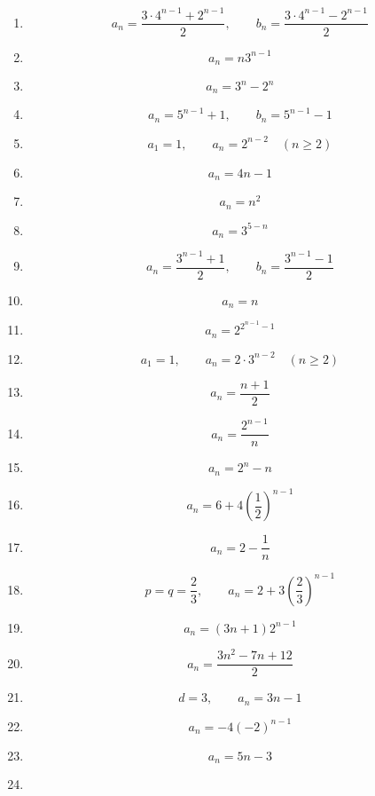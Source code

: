 \begin{enumerate}[label=\textbf{問\arabic*.},leftmargin=3.8em,format=\bookitemlink{practice-basic}{answer}{problem}]
        \item \[
            a_n=
            \frac{3\cdot4^{n-1}+2^{n-1}}2,
            \qquad
            b_n=
            \frac{3\cdot4^{n-1}-2^{n-1}}2
          \]
        \item \[
            a_n=n3^{n-1}
          \]
        \item \[
            a_n=3^n-2^n
          \]
        \item \[
            a_n=5^{n-1}+1,
            \qquad
            b_n=5^{n-1}-1
          \]
        \item \[
            a_1=1,\qquad
            a_n=2^{n-2}\quad(n\ge2)
          \]
        \item \[
            a_n=4n-1
          \]
        \item \[
            a_n=n^2
          \]
        \item \[
            a_n=3^{5-n}
          \]
        \item \[
            a_n=\frac{3^{n-1}+1}{2},
            \qquad
            b_n=\frac{3^{n-1}-1}{2}
          \]
        \item \[
            a_n=n
          \]
        \item \[
            a_n=2^{2^{n-1}-1}
          \]
        \item \[
            a_1=1,\qquad
            a_n=2\cdot3^{n-2}\quad(n\ge2)
          \]
        \item \[
            a_n=\frac{n+1}{2}
          \]
        \item \[
            a_n=\frac{2^{n-1}}{n}
          \]
        \item \[
            a_n=2^n-n
          \]
        \item \[
            a_n=6+4\left(\frac12\right)^{n-1}
          \]
        \item \[
            a_n=2-\frac1n
          \]
        \item \[
            p=q=\frac23,
            \qquad
            a_n=2+3\left(\frac23\right)^{n-1}
          \]
        \item \[
            a_n=(3n+1)2^{n-1}
          \]
        \item \[
            a_n=\frac{3n^2-7n+12}{2}
          \]
        \item \[
            d=3,\qquad a_n=3n-1
          \]
        \item \[
            a_n=-4(-2)^{n-1}
          \]
        \item \[
            a_n=5n-3
          \]
        \item \[
\]
\end{enumerate}
